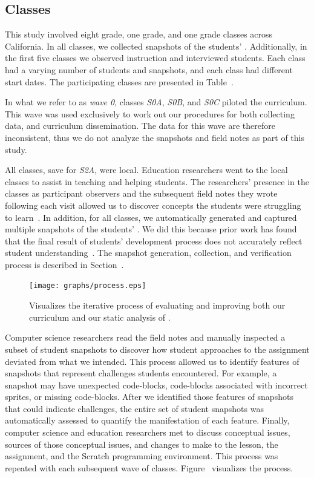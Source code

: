 \subsection{Classes} 
This study involved eight  grade, one  grade, and one 
grade classes across California. In all classes, we collected snapshots of the
students' . Additionally, in the first five classes we observed
instruction and interviewed students. Each class had a varying number of
students and snapshots, and each class had different start dates. The
participating classes are presented in Table~.

In what we refer to as \emph{wave 0}, classes \emph{S0A}, \emph{S0B}, and
\emph{S0C} piloted the curriculum. This wave was used exclusively to work out
our procedures for both collecting data, and curriculum dissemination. The data
for this wave are therefore inconsistent, thus we do not analyze the snapshots
and field notes as part of this study.

All classes, save for \emph{S2A}, were local. Education researchers went to the
local classes to assist in teaching and helping students. The researchers'
presence in the classes as participant observers and the subsequent field notes
they wrote following each visit allowed us to discover concepts the students
were struggling to learn~\cite{spradley80}. In addition, for all classes, we
automatically generated and captured multiple snapshots of the students'
. We did this because prior work has found that the final result of
students' development process does not accurately reflect student
understanding~\cite{Piech:2012:MSL:2157136.2157182,brennan12}. The snapshot
generation, collection, and verification process is described in
Section~.

\begin{figure}[!t]
\centering
\texttt{[image: graphs/process.eps]}
\caption{Visualizes the iterative process of evaluating and improving both our
  curriculum and our static analysis of .}
\end{figure}

Computer science researchers read the field notes and manually inspected a
subset of student snapshots to discover how student approaches to the
assignment deviated from what we intended. This process allowed us to identify
features of snapshots that represent challenges students encountered. For
example, a snapshot may have unexpected code-blocks, code-blocks associated
with incorrect sprites, or missing code-blocks.  After we identified those
features of snapshots that could indicate challenges, the entire set of student
snapshots was automatically assessed to quantify the manifestation of each
feature. Finally, computer science and education researchers met to discuss
conceptual issues, sources of those conceptual issues, and changes to make to
the lesson, the assignment, and the Scratch programming environment. This
process was repeated with each subsequent wave of
classes. Figure~ visualizes the process.

